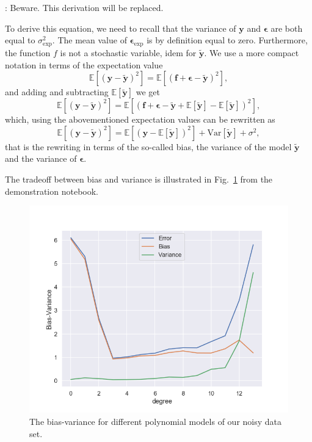 \documentclass[%
oneside,                 %
final,                   %
10pt]{article}
\newcommand{\shortinlinecomment}[3]{{\color{red}{\bf #1}: #2}}
\begin{document}
\shortinlinecomment{edit 1}{ Beware. This derivation will be replaced. }{ Beware. This derivation will }

To derive this equation, we need to recall that the variance of $\bm{y}$ and $\bm{\epsilon}$ are both equal to $\sigma^2_\mathrm{exp}$. The mean value of $\bm{\epsilon}_\mathrm{exp}$ is by definition equal to zero. Furthermore, the function $f$ is not a stochastic variable, idem for $\bm{\tilde{y}}$.
We use a more compact notation in terms of the expectation value 
\[
\mathbb{E}\left[(\bm{y}-\bm{\tilde{y}})^2\right]=\mathbb{E}\left[(\bm{f}+\bm{\epsilon}-\bm{\tilde{y}})^2\right],
\]
and adding and subtracting $\mathbb{E}\left[\bm{\tilde{y}}\right]$ we get
\[
\mathbb{E}\left[(\bm{y}-\bm{\tilde{y}})^2\right]=\mathbb{E}\left[(\bm{f}+\bm{\epsilon}-\bm{\tilde{y}}+\mathbb{E}\left[\bm{\tilde{y}}\right]-\mathbb{E}\left[\bm{\tilde{y}}\right])^2\right],
\]
which, using the abovementioned expectation values can be rewritten as 
\[
\mathbb{E}\left[(\bm{y}-\bm{\tilde{y}})^2\right]=\mathbb{E}\left[(\bm{y}-\mathbb{E}\left[\bm{\tilde{y}}\right])^2\right]+\mathrm{Var}\left[\bm{\tilde{y}}\right]+\sigma^2,
\]
that is the rewriting in terms of the so-called bias, the variance of the model $\bm{\tilde{y}}$ and the variance of $\bm{\epsilon}$.

The tradeoff between bias and variance is illustrated in Fig.~\ref{fig-bias_variance} from the demonstration notebook.


\begin{figure}[!ht]  %
  \centerline{\includegraphics[width=0.8\linewidth]{fig/bias_variance.png}}
  \caption{
  The bias-variance for different polynomial models of our noisy data set. \label{fig-bias_variance}
  }
\end{figure}
\end{document}
